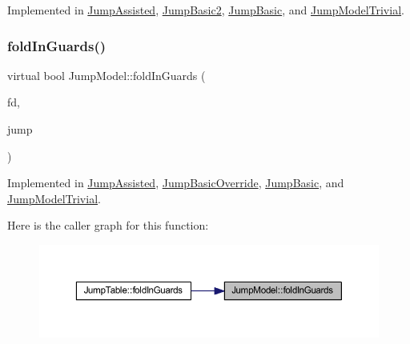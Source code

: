 Implemented in \mbox{\hyperlink{class_jump_assisted_a76bb3f116ab239f3b3f3fcf0410028d7}{Jump\+Assisted}}, \mbox{\hyperlink{class_jump_basic2_ab5d1cebab5d2f98d0caf6fc551b29980}{Jump\+Basic2}}, \mbox{\hyperlink{class_jump_basic_a2d542e5a6b74bd116d89ba4e5bb4da9b}{Jump\+Basic}}, and \mbox{\hyperlink{class_jump_model_trivial_a76017216abd7b4389f42e331d025d9dc}{Jump\+Model\+Trivial}}.

\mbox{\label{class_jump_model_a6f40ba77ddc8f4cf40f6071248103d9c}} 
\subsubsection{\texorpdfstring{foldInGuards()}{foldInGuards()}}
{\footnotesize\ttfamily virtual bool Jump\+Model\+::fold\+In\+Guards (\begin{DoxyParamCaption}\item[{\mbox{\hyperlink{class_funcdata}{Funcdata}} $\ast$}]{fd,  }\item[{\mbox{\hyperlink{class_jump_table}{Jump\+Table}} $\ast$}]{jump }\end{DoxyParamCaption})\hspace{0.3cm}{\ttfamily [pure virtual]}}



Implemented in \mbox{\hyperlink{class_jump_assisted_a9162ab4e23d4d31e7b16e46a42442a98}{Jump\+Assisted}}, \mbox{\hyperlink{class_jump_basic_override_a65b9faa5ee96e07e8a90ce492bc8c179}{Jump\+Basic\+Override}}, \mbox{\hyperlink{class_jump_basic_ae70d6baeeecb4b16e79de8516868ffe4}{Jump\+Basic}}, and \mbox{\hyperlink{class_jump_model_trivial_a063b80b921795c341598e643f5ee7cce}{Jump\+Model\+Trivial}}.

Here is the caller graph for this function\+:
\nopagebreak
\begin{figure}[H]
\begin{center}
\leavevmode
\includegraphics[width=350pt]{class_jump_model_a6f40ba77ddc8f4cf40f6071248103d9c_icgraph}
\end{center}
\end{figure}
\mbox{\label{class_jump_model_a8c346de087366515ed90ba1d27012451}} 

